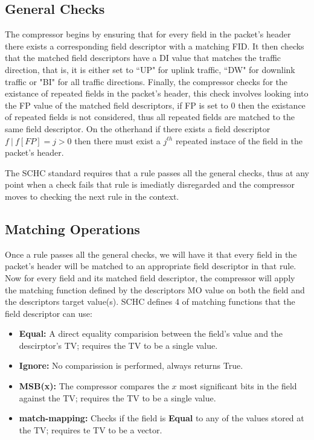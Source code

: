 \documentclass[12pt]{dalthesis}
\begin{document}
	\subsection{General Checks}
	The compressor begins by ensuring that for every field in the packet's header there exists a corresponding field descriptor with a matching FID.
	It then checks that the matched field descriptors have a DI value that matches the traffic direction, that is, it is 
	either set to ``UP" for uplink traffic, ``DW" for downlink traffic or "BI"
	for all traffic directions. Finally, the compressor checks for the existance of repeated fields in the packet's header, this check
	involves looking into the FP value of the matched field descriptors, if FP is set to 0 then the existance of repeated fields is not
	considered, thus all repeated fields are matched to the same field descriptor. On the otherhand if there exists a field descriptor
	$f\ | \ f[FP] = j >0$ then there must exist a $j^{th}$ repeated instace of the field in the packet's header.

	The SCHC standard requires that a rule passes all the general checks, thus at any point when a check fails that rule is imediatly
	disregarded and the compressor moves to checking the next rule in the context.

	\subsection{Matching Operations}
	Once a rule passes all the general checks, we will have it that every field in the packet's header will be matched to an appropriate
	field descriptor in that rule. Now for every field and its matched field descriptor, the compressor will apply the matching function
	defined by the descriptors MO value on both the field and the descriptors target value(s). SCHC defines 4 of matching functions
	that the field descriptor can use:
	
	\begin{itemize}
		\item \textbf{Equal:} A direct equality comparision between the field's value and the descirptor's TV; requires the TV to be a single value.
		\item \textbf{Ignore:} No comparission is performed, always returns True.
		\item \textbf{MSB(x):} The compressor compares the $x$ most significant bits in the field against the TV; requires the TV to be a single value.
		\item \textbf{match-mapping:} Checks if the field is \textbf{Equal} to any of the values stored at the TV; requires te TV to be a vector.
	\end{itemize}
	
\end{document}
